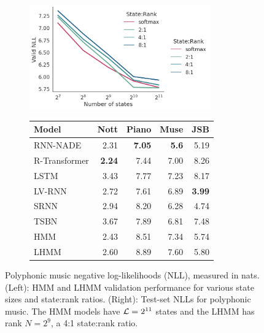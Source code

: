 \documentclass{article}
\begin{document}
\begin{figure}[t]
\centering
\begin{subfigure}{0.45\textwidth}
\centering
\includegraphics[height=4.5cm,trim={0 0 14.5em 0},clip]{imgs/hmm/music-states-features-dropout.png}
\end{subfigure}
\begin{subfigure}{0.50\textwidth}
\centering
\begin{tabular}{lrrrr}
\toprule
Model       & Nott & Piano & Muse & JSB \\
\midrule
RNN-NADE & 2.31  & \textbf{7.05}        & \textbf{5.6}        & 5.19          \\
R-Transformer & \textbf{2.24} & 7.44 & 7.00 & 8.26 \\
LSTM  & 3.43 & 7.77   & 7.23 & 8.17     \\
LV-RNN    & 2.72       & 7.61        & 6.89       &\textbf{ 3.99}\\
SRNN     & 2.94       & 8.20         & 6.28       & 4.74          \\
\midrule
TSBN     & 3.67       & 7.89        & 6.81       & 7.48          \\
HMM &  2.43 & 8.51 & 7.34 & 5.74 \\
LHMM & 2.60 & 8.89 & 7.60 & 5.80 \\
\bottomrule
\end{tabular}
\end{subfigure}
\caption{\label{fig:music}
Polyphonic music negative log-likelihoods (NLL), measured in nats.
(Left): HMM and LHMM validation performance for various state sizes and state:rank ratios. 
(Right): Test-set NLLs for polyphonic music.
The HMM models have $\mathcal{L}=2^{11}$ states and the LHMM has rank $N=2^{9}$, a 4:1 state:rank ratio.}
\end{figure}
\end{document}
